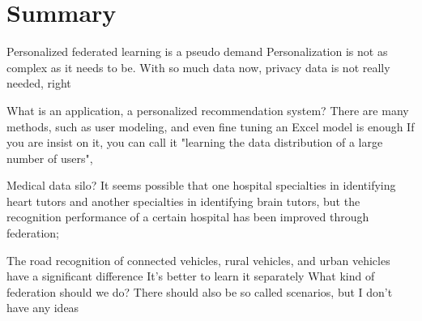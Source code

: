 \section{Summary}
Personalized federated learning is a pseudo demand Personalization is not as complex as it needs to be. With so much data now, privacy data is not really needed, right

What is an application, a personalized recommendation system? There are many methods, such as user modeling, and even fine tuning an Excel model is enough If you are insist on it, you can call it "learning the data distribution of a large number of users",

Medical data silo? It seems possible that one hospital specialties in identifying heart tutors and another specialties in identifying brain tutors, but the recognition performance of a certain hospital has been improved through federation;

The road recognition of connected vehicles, rural vehicles, and urban vehicles have a significant difference It's better to learn it separately What kind of federation should we do? There should also be so called scenarios, but I don't have any ideas
